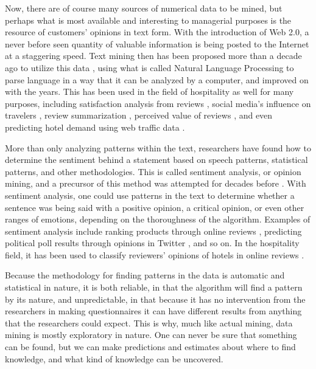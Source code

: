 \documentclass[review]{elsarticle}
\begin{document}
Now, there are of course many sources of numerical data to be mined, but perhaps what is most available and interesting to managerial purposes is the resource of customers' opinions in text form. With the introduction of Web 2.0, a never before seen quantity of valuable information is being posted to the Internet at a staggering speed. Text mining then has been proposed more than a decade ago to utilize this data \cite[e.g.][]{rajman1998text,nahm2002text}, using what is called Natural Language Processing to parse language in a way that it can be analyzed by a computer, and improved on with the years. This has been used in the field of hospitality as well for many purposes, including satisfaction analysis from reviews \cite[e.g][]{berezina2016, xu2016, xiang2015, hargreaves2015, balbi2018}, social media's influence on travelers \cite[e.g.][]{xiang2010}, review summarization \cite[e.g.][]{hu2017436}, perceived value of reviews \cite[e.g][]{FANG2016498}, and even predicting hotel demand using web traffic data \cite[e.g][]{yang2014}.

More than only analyzing patterns within the text, researchers have found how to determine the sentiment behind a statement based on speech patterns, statistical patterns, and other methodologies. This is called sentiment analysis, or opinion mining, and a precursor of this method was attempted for decades before \cite[][]{stone1966general}. With sentiment analysis, one could use patterns in the text to determine whether a sentence was being said with a positive opinion, a critical opinion, or even other ranges of emotions, depending on the thoroughness of the algorithm. Examples of sentiment analysis include ranking products through online reviews \cite[e.g][]{liu2017149, zhang2011}, predicting political poll results through opinions in Twitter \cite[][]{oconnor2010}, and so on. In the hospitality field, it has been used to classify reviewers' opinions of hotels in online reviews \cite[e.g.]{kim2017362, alsmadi2018}. 

Because the methodology for finding patterns in the data is automatic and statistical in nature, it is both reliable, in that the algorithm will find a pattern by its nature, and unpredictable, in that because it has no intervention from the researchers in making questionnaires it can have different results from anything that the researchers could expect. This is why, much like actual mining, data mining is mostly exploratory in nature. One can never be sure that something can be found, but we can make predictions and estimates about where to find knowledge, and what kind of knowledge can be uncovered. 
\end{document}
